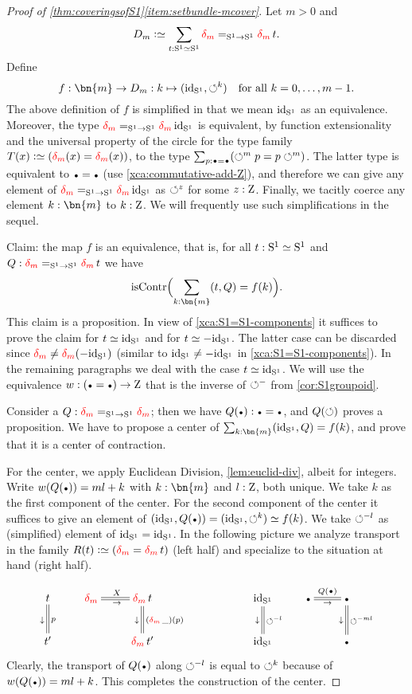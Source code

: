 \begin{proof}[Proof of \cref{thm:coveringsofS1}\ref{item:setbundle-mcover}]
Let $m>0$ and $$D_m\defequi\sum_{t:\Sc\equiv\Sc} \dg{m} =_{\Sc\to\Sc} \dg{m} t.$$
Define 
\[
f: \bn{m} \to D_m: k \mapsto (\id_\Sc,{\Sloop}^k)\quad\text{for all $k=0,\ldots,m-1$}.
\]
The above definition of $f$ is simplified in that we mean $\mathord{\mathrm{id}}_{\mathrm{S}^1}$
as an equivalence. Moreover, the type $\dg{m} =_{\Sc\to\Sc} \dg{m} \id_\Sc$ is equivalent,
by function extensionality and the universal property of the circle for 
the type family $T(x)\defeq (\dg{m}(x) = \dg{m}(x))$, to the type 
$\sum_{p: \base=\base} (\Sloop^m p = p \Sloop^m)$.
The latter type is equivalent to $\base=\base$ (use \cref{xca:commutative-add-Z}), and therefore
we can give any element of $\dg{m} =_{\Sc\to\Sc} \dg{m} \id_\Sc$ as $\circlearrowleft^z$ for some $z:\mathrm{Z}$.
Finally, we tacitly coerce any element $k:\bn{m}$ to $k:\mathrm{Z}$.
We will frequently use such simplifications in the sequel.

Claim: the map $f$ is an equivalence, that is,
for all $t:{\mathrm{S}^1}\simeq{\mathrm{S}^1}$ and $Q : \dg{m} =_{\Sc\to\Sc} \dg{m} t$ we have
\[
\iscontr\Bigl(\sum_{k:\bn{m}} (t,Q) = f(k)\Bigr).
\]
This claim is a proposition.
In view of \cref{xca:S1=S1-components} it suffices to prove the claim
for $t\jdeq\id_\Sc$ and for $t\jdeq -\id_\Sc$. The latter case can be discarded
since $\dg{m} \neq \dg{m} (-\id_\Sc)$ 
(similar to $\mathord{\mathrm{id}}_{\mathrm{S}^1} \neq -\mathord{\mathrm{id}}_{\mathrm{S}^1}$ in \cref{xca:S1=S1-components}).
In the remaining paragraphs we deal with the case $t\jdeq\id_\Sc$.
We will use the equivalence $w: (\base=\base)\to\zet$ that
is the inverse of ${\circlearrowleft}^{-}$ from \cref{cor:S1groupoid}.

Consider a $Q: \dg{m} =_{\Sc\to\Sc} \dg{m}$; then we have $Q(\base): \base=\base$,
and $Q(\circlearrowleft)$ proves a proposition. 
We have to propose a center of $\sum_{k:\bn{m}} (\id_\Sc,Q) = f(k)$, 
and prove that it is a center of contraction.

For the center, we apply Euclidean Division, \cref{lem:euclid-div}, albeit for integers.
Write $w(Q(\base)) = ml+k$ with $k:\bn{m}$ and $l:\mathrm{Z}$, both unique.
We take $k$ as the first component of the center.
For the second component of the center it suffices to give an element of 
$(\id_\Sc,Q(\base))=(\id_\Sc,{\Sloop}^k)\jdeq f(k)$. 
We take ${\circlearrowleft}^{-l}$ as (simplified) element of $\mathord{\mathrm{id}}_{\mathrm{S}^1} = \mathord{\mathrm{id}}_{\mathrm{S}^1}$.
In the following picture we analyze transport in the family $R(t)\defeq(\dg{m} = \dg{m} t)$ 
(left half) and specialize to the situation at hand (right half).

\[
\xymatrix{
t\ar@{=}[d]^{p}_\downarrow
& \dg{m}\ar@{=}[r]^{X}_\rightarrow 
&\dg{m} t \ar@{=}[d]^{(\dg{m} \_)(p)}_\downarrow &&
&\id_\Sc\ar@{=}[d]^{{\Sloop}^{-l}}_\downarrow
& \base\ar@{=}[r]^{Q(\base)}_\rightarrow 
& \base\ar@{=}[d]^{{\Sloop}^{-ml}}_\downarrow 
\\
t'&&\dg{m} t' &&
&\id_\Sc   &&\base{\vphantom{t}}}
\]
Clearly, the transport of $Q(\base)$ along ${\circlearrowleft}^{-l}$ is 
equal to ${\circlearrowleft}^{k}$ because of $w(Q(\base)) = ml+k$.
This completes the construction of the center.


\end{proof}
